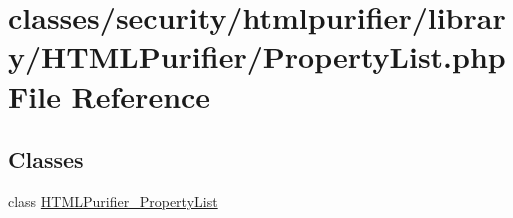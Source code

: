\hypertarget{PropertyList_8php}{\section{classes/security/htmlpurifier/library/\+H\+T\+M\+L\+Purifier/\+Property\+List.php File Reference}
\label{PropertyList_8php}
}
\subsection*{Classes}
\begin{DoxyCompactItemize}
\item 
class \hyperlink{classHTMLPurifier__PropertyList}{H\+T\+M\+L\+Purifier\+\_\+\+Property\+List}
\end{DoxyCompactItemize}
